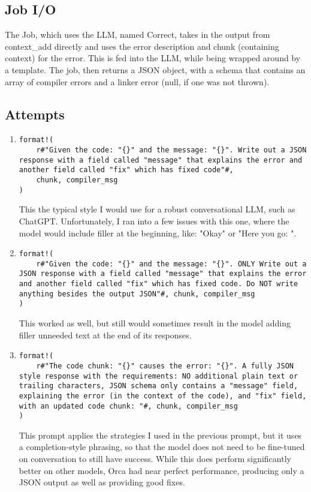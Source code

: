 \documentclass{article}
\begin{document}
	\subsection{Job I/O}
		The Job, which uses the LLM, named Correct, takes in the output from context\_add directly and uses the error description and chunk (containing context) for the error. This is fed into the LLM, while being wrapped around by a template. The job, then returns a JSON object, with a schema that contains an array of compiler errors and a linker error (null, if one was not thrown).

	\subsection{Attempts}
		\begin{enumerate}
			\item
			\begin{verbatim}
format!(
	r#"Given the code: "{}" and the message: "{}". Write out a JSON response with a field called "message" that explains the error and another field called "fix" which has fixed code"#,
    chunk, compiler_msg
)
			\end{verbatim}
			This the typical style I would use for a robust conversational LLM, such as ChatGPT. Unfortunately, I ran into a few issues with this one, where the model would include filler at the beginning, like: "Okay" or "Here you go: ".

			\item
			\begin{verbatim}
format!(
	r#"Given the code: "{}" and the message: "{}". ONLY Write out a JSON response with a field called "message" that explains the error and another field called "fix" which has fixed code. Do NOT write anything besides the output JSON"#, chunk, compiler_msg
)

			\end{verbatim}
			This worked as well, but still would sometimes result in the model adding filler unneeded text at the end of its responses.

			\item
			\begin{verbatim}
format!(
	r#"The code chunk: "{}" causes the error: "{}". A fully JSON style response with the requirements: NO additional plain text or trailing characters, JSON schema only contains a "message" field, explaining the error (in the context of the code), and "fix" field, with an updated code chunk: "#, chunk, compiler_msg
)
			\end{verbatim}
			This prompt applies the strategies I used in the previous prompt, but it uses a completion-style phrasing, so that the model does not need to be fine-tuned on conversation to still have success. While this does perform significantly better on other models, Orca had near perfect performance, producing only a JSON output as well as providing good fixes.


\end{enumerate}
\end{document}
